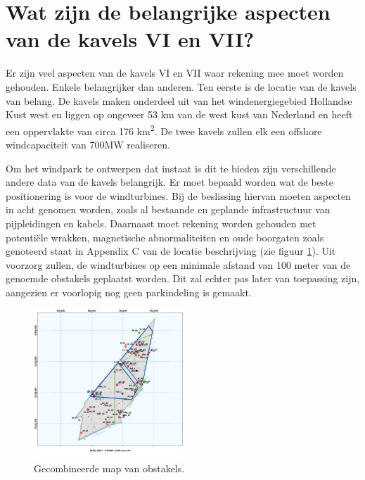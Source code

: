 \section{Wat zijn de belangrijke aspecten van de kavels VI en VII?} \label{Wat zijn de belangrijke aspecten van de Kavels VI en VII?}

Er zijn veel aspecten van de kavels VI en VII waar rekening mee moet worden gehouden. Enkele belangrijker dan anderen. Ten eerste is de locatie van de kavels van belang. De kavels maken onderdeel uit van het windenergiegebied Hollandse Kust west en liggen op ongeveer 53 km van de west kust van Nederland en heeft een oppervlakte van circa 176 km\textsuperscript{2}.\cite{SiteDescriptionRVO} De twee kavels zullen elk een \gls{offshore} windcapaciteit van 700MW realiseren.\cite{SiteDescriptionRVO}\cite{Functies&gebruikHKW}

Om het windpark te ontwerpen dat instaat is dit te bieden zijn verschillende andere data van de kavels belangrijk. Er moet bepaald worden wat de beste positionering is voor de windturbines. Bij de beslissing hiervan moeten aspecten in acht genomen worden, zoals al bestaande en geplande infrastructuur van pijpleidingen en kabels. Daarnaast moet rekening worden gehouden met potentiële wrakken, magnetische abnormaliteiten en oude boorgaten zoals genoteerd staat in Appendix C van de locatie beschrijving (zie figuur \ref{fig:obstakels}).\cite{SiteDescriptionRVO}\cite{AppendixC} Uit voorzorg zullen, de windturbines op een minimale afstand van 100 meter van de genoemde obstakels geplaatst worden. Dit zal echter pas later van toepassing zijn, aangezien er voorlopig nog geen parkindeling is gemaakt. 
\begin{figure}[h]
\centering
\includegraphics[width=0.5\textwidth]{IMG/data/overzicht/Map.png}
\caption{Gecombineerde map van obstakels.}
\label{fig:obstakels}
\end{figure}


